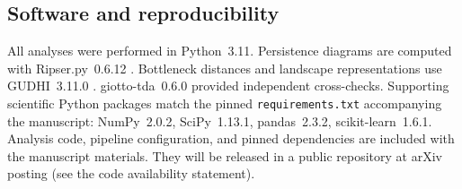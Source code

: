 \subsection{Software and reproducibility}

All analyses were performed in Python~3.11. Persistence diagrams are
computed with Ripser.py~0.6.12 \citep{bauer2021ripser,tralie2018}.
Bottleneck distances and landscape representations use
GUDHI~3.11.0 \citep{gudhi2014}. giotto-tda~0.6.0 \citep{tauzin2021}
provided independent cross-checks. Supporting scientific Python packages
match the pinned \texttt{requirements.txt} accompanying the manuscript:
NumPy~2.0.2, SciPy~1.13.1, pandas~2.3.2, scikit-learn~1.6.1. Analysis
code, pipeline configuration, and pinned dependencies are included with
the manuscript materials. They will be released in a public repository
at arXiv posting (see the code availability statement).
